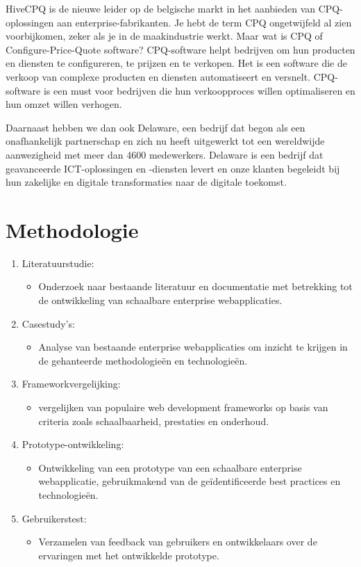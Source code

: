 \documentclass{hogent-article}
\begin{document}
\begin{samenvatting}
HiveCPQ is de nieuwe leider op de belgische markt in het aanbieden van CPQ-oplossingen aan enterprise-fabrikanten. Je hebt de term CPQ ongetwijfeld al zien voorbijkomen, zeker als je in de maakindustrie werkt. Maar wat is CPQ of Configure-Price-Quote software? CPQ-software helpt bedrijven om hun producten en diensten te configureren, te prijzen en te verkopen. Het is een software die de verkoop van complexe producten en diensten automatiseert en versnelt. CPQ-software is een must voor bedrijven die hun verkoopproces willen optimaliseren en hun omzet willen verhogen. 

Daarnaast hebben we dan ook Delaware, een bedrijf dat begon als een onafhankelijk partnerschap en zich nu heeft uitgewerkt tot een wereldwijde aanwezigheid met meer dan 4600 medewerkers. Delaware is een bedrijf dat geavanceerde ICT-oplossingen en -diensten levert en onze klanten begeleidt bij hun zakelijke en digitale transformaties naar de digitale toekomst.

\section*{Methodologie}
\begin{enumerate}
  \item Literatuurstudie: 
  \begin{itemize}
    \item Onderzoek naar bestaande literatuur en documentatie met betrekking tot de ontwikkeling van schaalbare enterprise webapplicaties.
  \end{itemize}
  \item Casestudy's: 
  \begin{itemize}
    \item Analyse van bestaande enterprise webapplicaties om inzicht te krijgen in de gehanteerde methodologieën en technologieën.
  \end{itemize}
  \item Frameworkvergelijking:
  \begin{itemize}
    \item vergelijken van populaire web development frameworks op basis van criteria zoals schaalbaarheid, prestaties en onderhoud.
  \end{itemize}
  \item Prototype-ontwikkeling: 
  \begin{itemize}
    \item Ontwikkeling van een prototype van een schaalbare enterprise webapplicatie, gebruikmakend van de geïdentificeerde best practices en technologieën.
  \end{itemize}
  \item Gebruikerstest:
  \begin{itemize}
    \item Verzamelen van feedback van gebruikers en ontwikkelaars over de ervaringen met het ontwikkelde prototype.
  \end{itemize}
\end{enumerate}


\end{samenvatting}
\end{document}
